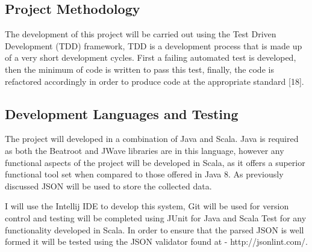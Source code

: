 \documentclass[a4paper, 11pt]{article}
\begin{document}
\subsection{Project Methodology}
The development of this project will be carried out using the Test Driven Development (TDD) framework, TDD is a development process that is made up of a very short development cycles. First a failing automated test is developed, then the minimum of code is written to pass this test, finally, the code is refactored accordingly in order to produce code at the appropriate standard [18].

\subsection{Development Languages and Testing}
The project will developed in a combination of Java and Scala. Java is required as both the Beatroot and JWave libraries are in this language, however any functional aspects of the project will be developed in Scala, as it offers a superior functional tool set when compared to those offered in Java 8. As previously discussed JSON will be used to store the collected data.

I will use the Intellij IDE to develop this system, Git will be used for version control and testing will be completed using JUnit for Java and Scala Test for any functionality developed in Scala. In order to ensure that the parsed JSON is well formed it will be tested using the JSON validator found at - http://jsonlint.com/.

\clearpage
\maketitle{} 
\end{document}
